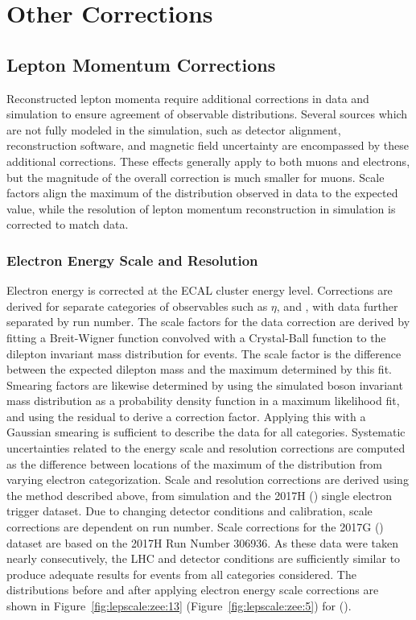 \chapter{Other Corrections}\label{ch:corrs}
\section{Lepton Momentum Corrections}
Reconstructed lepton momenta require additional corrections in data and simulation to ensure agreement of observable distributions. Several sources which are not fully modeled in the simulation, such as detector alignment, reconstruction software, and magnetic field uncertainty are encompassed by these additional corrections. These effects generally apply to both muons and electrons, but the magnitude of the overall correction is much smaller for muons. Scale factors align the maximum of the \zll \mll distribution observed in data to the expected value, while the resolution of lepton momentum reconstruction in simulation is corrected to match data.
\subsection{Electron Energy Scale and Resolution}
Electron energy is corrected at the ECAL cluster energy level. Corrections are derived for separate categories of observables such as $\eta$, and \et, with data further separated by run number. The scale factors for the data correction are derived by fitting a Breit-Wigner function\cite{Breit:1936zzb} convolved with a Crystal-Ball function\cite{Oreglia:1980cs,Skwarnicki:1986xj} to the dilepton invariant mass distribution for \zee events. The scale factor is the difference between the expected dilepton mass and the maximum determined by this fit. Smearing factors are likewise determined by using the simulated \Z boson invariant mass distribution as a probability density function in a maximum likelihood fit, and using the residual to derive a correction factor. Applying this with a Gaussian smearing is sufficient to describe the data for all categories\cite{Khachatryan:2015iwa}.
Systematic uncertainties related to the energy scale and resolution corrections are computed as the difference between locations of the maximum of the \zee \mll distribution from varying electron categorization. 
Scale and resolution corrections are derived using the method described above, from \zee simulation and the 2017H (\sh) single electron trigger dataset. Due to changing detector conditions and calibration, scale corrections are dependent on run number. Scale corrections for the 2017G (\sg) dataset are based on the 2017H Run Number 306936. As these data were taken nearly consecutively, the LHC and detector conditions are sufficiently similar to produce adequate results for events from all categories considered.
The \mll distributions before and after applying electron energy scale corrections are shown in Figure~\ref{fig:lepscale:zee:13} (Figure~\ref{fig:lepscale:zee:5}) for \sh (\sg). 

